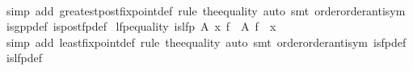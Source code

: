 \begin{isabellebody}
%
\isadelimproof
\ \ %
\endisadelimproof
%
\isatagproof
{}\isamarkupfalse%
\ {}simp\ add{}\ greatest{}postfix{}point{}def{}\ rule\ the{}equality{}\ auto{}\ smt\ order{}order{}antisym\ is{}gpp{}def\ is{}post{}fp{}def{}%
\endisatagproof
{\isafoldproof}%
%
\isadelimproof
\isanewline
%
\endisadelimproof
\isanewline
{}\isamarkupfalse%
\ lfp{}equality{}\ {}is{}lfp\ A\ x\ f\ {}\ {}\isactrlbsub A\isactrlesub \ f\ {}\ x{}\isanewline
%
\isadelimproof
\ \ %
\endisadelimproof
%
\isatagproof
{}\isamarkupfalse%
\ {}simp\ add{}\ least{}fixpoint{}def{}\ rule\ the{}equality{}\ auto{}\ smt\ order{}order{}antisym\ is{}fp{}def\ is{}lfp{}def{}%
\endisatagproof
{\isafoldproof}%
%
\isadelimproof
\isanewline
%
\endisadelimproof
\isanewline
{}\isamarkupfalse%

\end{isabellebody}

